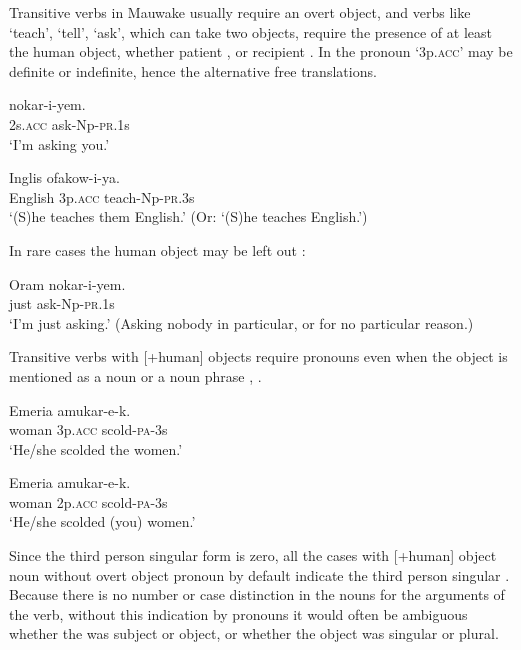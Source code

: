 Transitive verbs in Mauwake usually require an overt object, and verbs like `teach', `tell', `ask', which can take two objects, require the presence of at least the human object, whether patient , or recipient . In  the pronoun  `3p.\textsc{acc}' may be definite or indefinite, hence the alternative free translations.

\ea%
\label{ex:3:x552}
\gll {} nokar-i-yem. \\
2s.\textsc{acc} ask-Np-\textsc{pr}.1s\\
\glt`I'm asking you.'
\z

\ea%
\label{ex:3:x551}
\gll Inglis  ofakow-i-ya. \\
English 3p.\textsc{acc} teach-Np-\textsc{pr}.3s\\
\glt`(S)he teaches them English.' (Or: `(S)he teaches English.')
\z

In rare cases the human object may be left out :

\ea%
\label{ex:3:x553}
\gll Oram nokar-i-yem. \\
just ask-Np-\textsc{pr}.1s\\
\glt`I'm just asking.' (Asking nobody in particular, or for no particular reason.)
\z

Transitive verbs with [+human] objects require pronouns even when the object is mentioned as a noun or a noun phrase , .

\ea%
\label{ex:3:x554}
\gll Emeria  amukar-e-k. \\
woman 3p.\textsc{acc} scold-\textsc{pa}-3s\\
\glt`He/she scolded the women.'
\z

\ea%
\label{ex:3:x555}
\gll Emeria  amukar-e-k. \\
woman 2p.\textsc{acc} scold-\textsc{pa}-3s\\
\glt`He/she scolded (you) women.'
\z

Since the third person singular form is zero, all the cases with [+human] object noun without overt object pronoun by default indicate the third person singular . Because there is no number or case distinction in the nouns for the arguments of the verb, without this indication by pronouns it would often be ambiguous whether the  was subject or object, or whether the object was singular or plural. 

